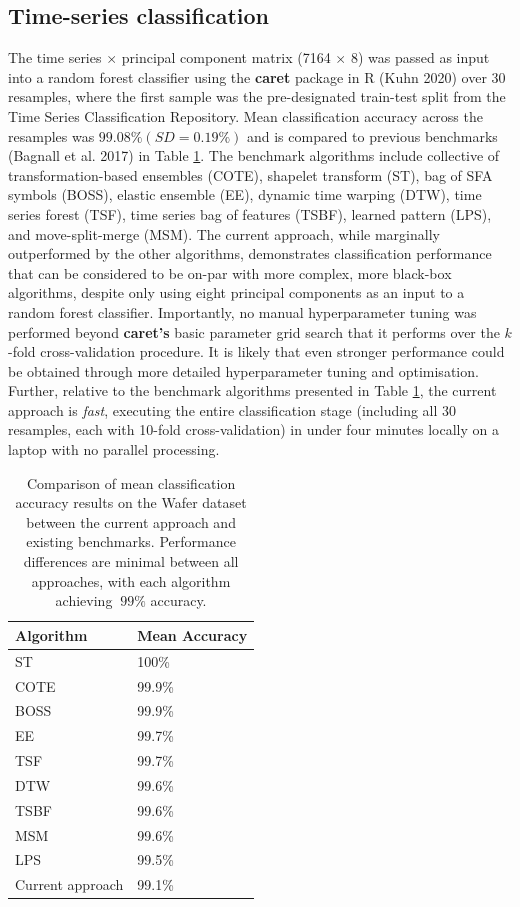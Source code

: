 \documentclass{article}
\begin{document}
\hypertarget{time-series-classification}{%
\subsection{Time-series classification}\label{time-series-classification}}

The time series \(\times\) principal component matrix (7164 \(\times\) 8) was passed as input into a random forest classifier using the \textbf{caret} package in R (Kuhn 2020) over 30 resamples, where the first sample was the pre-designated train-test split from the Time Series Classification Repository. Mean classification accuracy across the resamples was \(99.08\% (SD=0.19\%)\) and is compared to previous benchmarks (Bagnall et al. 2017) in Table \ref{tab:comptable}. The benchmark algorithms include collective of transformation-based ensembles (COTE), shapelet transform (ST), bag of SFA symbols (BOSS), elastic ensemble (EE), dynamic time warping (DTW), time series forest (TSF), time series bag of features (TSBF), learned pattern (LPS), and move-split-merge (MSM). The current approach, while marginally outperformed by the other algorithms, demonstrates classification performance that can be considered to be on-par with more complex, more black-box algorithms, despite only using eight principal components as an input to a random forest classifier. Importantly, no manual hyperparameter tuning was performed beyond \textbf{caret's} basic parameter grid search that it performs over the \(k\)-fold cross-validation procedure. It is likely that even stronger performance could be obtained through more detailed hyperparameter tuning and optimisation. Further, relative to the benchmark algorithms presented in Table \ref{tab:comptable}, the current approach is \emph{fast}, executing the entire classification stage (including all 30 resamples, each with 10-fold cross-validation) in under four minutes locally on a laptop with no parallel processing.

\begin{table}

\caption{\label{tab:comptable}Comparison of mean classification accuracy results on the Wafer dataset between the current approach and existing benchmarks. Performance differences are minimal between all approaches, with each algorithm achieving $\>99\%$ accuracy.}
\centering
\begin{tabular}[t]{l|l}
\hline
Algorithm & Mean Accuracy\\
\hline
ST & 100\%\\
\hline
COTE & 99.9\%\\
\hline
BOSS & 99.9\%\\
\hline
EE & 99.7\%\\
\hline
TSF & 99.7\%\\
\hline
DTW & 99.6\%\\
\hline
TSBF & 99.6\%\\
\hline
MSM & 99.6\%\\
\hline
LPS & 99.5\%\\
\hline
Current approach & 99.1\%\\
\hline
\end{tabular}
\end{table}
\end{document}
